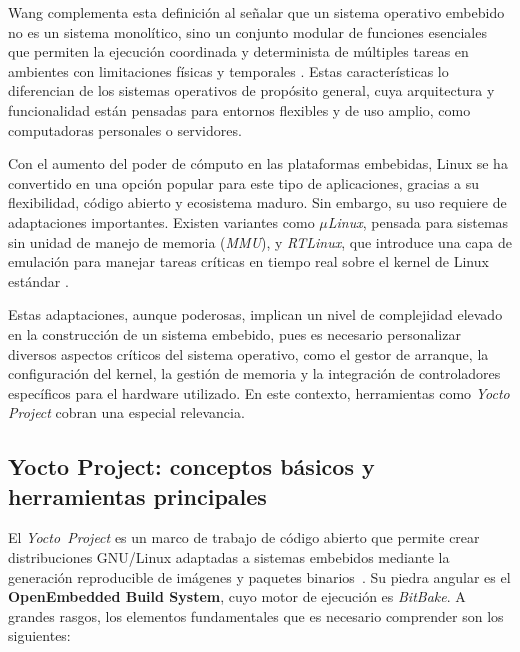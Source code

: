Wang complementa esta definición al señalar que un sistema operativo embebido no es un sistema monolítico, sino un conjunto modular de funciones esenciales que permiten la ejecución coordinada y determinista de múltiples tareas en ambientes con limitaciones físicas y temporales \cite{wang_2023_embedded_RTOS}. Estas características lo diferencian de los sistemas operativos de propósito general, cuya arquitectura y funcionalidad están pensadas para entornos flexibles y de uso amplio, como computadoras personales o servidores.

Con el aumento del poder de cómputo en las plataformas embebidas, Linux se ha convertido en una opción popular para este tipo de aplicaciones, gracias a su flexibilidad, código abierto y ecosistema maduro. Sin embargo, su uso requiere de adaptaciones importantes. Existen variantes como \textit{$\mu$Linux}, pensada para sistemas sin unidad de manejo de memoria (\textit{MMU}), y \textit{RTLinux}, que introduce una capa de emulación para manejar tareas críticas en tiempo real sobre el kernel de Linux estándar \cite{holt_2018_embedded_os} \cite{wang_2023_embedded_RTOS}.

Estas adaptaciones, aunque poderosas, implican un nivel de complejidad elevado en la construcción de un sistema embebido, pues es necesario personalizar diversos aspectos críticos del sistema operativo, como el gestor de arranque, la configuración del kernel, la gestión de memoria y la integración de controladores específicos para el hardware utilizado. En este contexto, herramientas como \textit{Yocto Project} cobran una especial relevancia. 

\subsection{Yocto Project: conceptos básicos y herramientas principales}

El \textit{Yocto Project} es un marco de trabajo de código abierto que permite crear distribuciones GNU/Linux adaptadas a sistemas embebidos mediante la generación reproducible de imágenes y paquetes binarios \cite{yocto_overview_2025}. Su piedra angular es el \textbf{OpenEmbedded Build System}, cuyo motor de ejecución es \textit{BitBake}.  A grandes rasgos, los elementos fundamentales que es necesario comprender son los siguientes:

